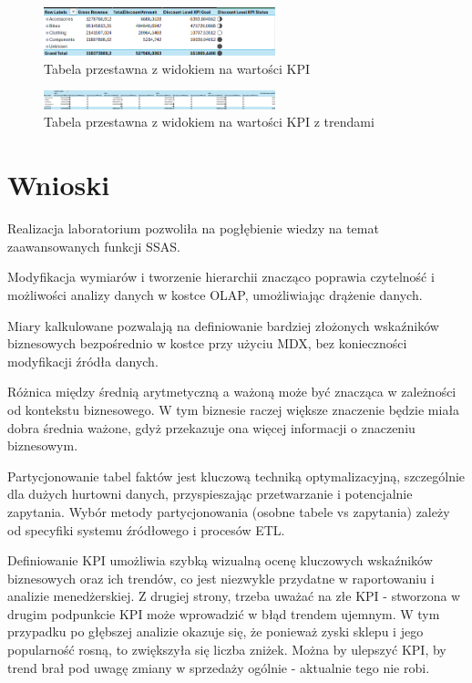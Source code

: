 \documentclass[a4paper,12pt]{article}
\begin{document}
\begin{figure}[H]
  \centering
  \includegraphics[width=0.6\textwidth]{5b_analysis.png}
  \caption{Tabela przestawna z widokiem na wartości KPI}
\end{figure}

\begin{figure}[H]
  \centering
  \includegraphics[width=0.6\textwidth]{5b_analysis_2.png}
  \caption{Tabela przestawna z widokiem na wartości KPI z trendami}
\end{figure}

\section{Wnioski}

Realizacja laboratorium pozwoliła na pogłębienie wiedzy na temat zaawansowanych funkcji SSAS.

Modyfikacja wymiarów i tworzenie hierarchii znacząco poprawia czytelność i możliwości analizy danych w kostce OLAP, umożliwiając drążenie danych.

Miary kalkulowane pozwalają na definiowanie bardziej złożonych wskaźników biznesowych bezpośrednio w kostce przy użyciu MDX, bez konieczności modyfikacji źródła danych.

Różnica między średnią arytmetyczną a ważoną może być znacząca w zależności od kontekstu biznesowego. W tym biznesie raczej większe znaczenie będzie miała dobra średnia ważone, gdyż przekazuje ona więcej informacji o znaczeniu biznesowym.

Partycjonowanie tabel faktów jest kluczową techniką optymalizacyjną, szczególnie dla dużych hurtowni danych, przyspieszając przetwarzanie i potencjalnie zapytania. Wybór metody partycjonowania (osobne tabele vs zapytania) zależy od specyfiki systemu źródłowego i procesów ETL.

Definiowanie KPI umożliwia szybką wizualną ocenę kluczowych wskaźników biznesowych oraz ich trendów, co jest niezwykle przydatne w raportowaniu i analizie menedżerskiej.
Z drugiej strony, trzeba uważać na złe KPI - stworzona w drugim podpunkcie KPI może wprowadzić w błąd trendem ujemnym. W tym przypadku po głębszej analizie okazuje się, że ponieważ zyski sklepu i jego popularność rosną, to zwiększyła się liczba zniżek. Można by ulepszyć KPI, by trend brał pod uwagę zmiany w sprzedaży ogólnie - aktualnie tego nie robi.

\printbibliography
\end{document}
